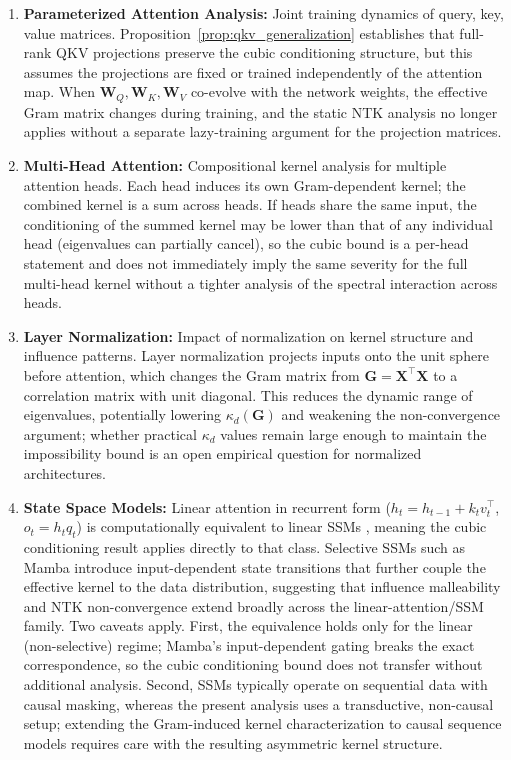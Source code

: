 \documentclass{article}
\theoremstyle{plain}
\theoremstyle{definition}
\theoremstyle{remark}
\begin{document}
\begin{enumerate}
\item \textbf{Parameterized Attention Analysis:} Joint training dynamics of query, key, value matrices. Proposition~\ref{prop:qkv_generalization} establishes that full-rank QKV projections preserve the cubic conditioning structure, but this assumes the projections are fixed or trained independently of the attention map. When $\mathbf{W}_Q, \mathbf{W}_K, \mathbf{W}_V$ co-evolve with the network weights, the effective Gram matrix changes during training, and the static NTK analysis no longer applies without a separate lazy-training argument for the projection matrices.
\item \textbf{Multi-Head Attention:} Compositional kernel analysis for multiple attention heads. Each head induces its own Gram-dependent kernel; the combined kernel is a sum across heads. If heads share the same input, the conditioning of the summed kernel may be lower than that of any individual head (eigenvalues can partially cancel), so the cubic bound is a per-head statement and does not immediately imply the same severity for the full multi-head kernel without a tighter analysis of the spectral interaction across heads.
\item \textbf{Layer Normalization:} Impact of normalization on kernel structure and influence patterns. Layer normalization projects inputs onto the unit sphere before attention, which changes the Gram matrix from $\mathbf{G} = \mathbf{X}^\top\mathbf{X}$ to a correlation matrix with unit diagonal. This reduces the dynamic range of eigenvalues, potentially lowering $\kappa_d(\mathbf{G})$ and weakening the non-convergence argument; whether practical $\kappa_d$ values remain large enough to maintain the impossibility bound is an open empirical question for normalized architectures.
\item \textbf{State Space Models:} Linear attention in recurrent form ($h_t = h_{t-1} + k_t v_t^\top$, $o_t = h_t q_t$) is computationally equivalent to linear SSMs \citep{katharopoulos2020transformers}, meaning the cubic conditioning result applies directly to that class. Selective SSMs such as Mamba \citep{gu2023mamba} introduce input-dependent state transitions that further couple the effective kernel to the data distribution, suggesting that influence malleability and NTK non-convergence extend broadly across the linear-attention/SSM family. Two caveats apply. First, the equivalence holds only for the linear (non-selective) regime; Mamba's input-dependent gating breaks the exact correspondence, so the cubic conditioning bound does not transfer without additional analysis. Second, SSMs typically operate on sequential data with causal masking, whereas the present analysis uses a transductive, non-causal setup; extending the Gram-induced kernel characterization to causal sequence models requires care with the resulting asymmetric kernel structure.
\end{enumerate}
\end{document}
